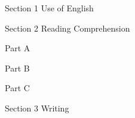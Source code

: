 \documentclass[a4paper]{article}
\begin{document}
\begin{center}
Section 1 Use of English



\vspace{6pt}
Section 2 Reading Comprehension

Part A



Part B



Part C
\end{center}



\begin{center}Section 3 Writing\end{center}


\end{document}
